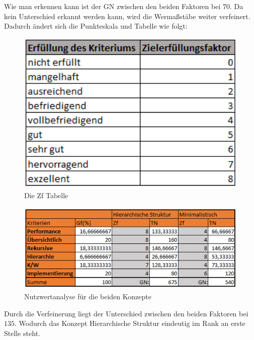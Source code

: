 Wie man erkennen kann ist der \ac{GN} zwischen den beiden Faktoren bei $70$.
Da kein Unterschied erkannt werden kann, wird die Wermaßstäbe weiter verfeinert.
Dadurch ändert sich die Punkteskala und Tabelle wie folgt:
\begin{figure}[h!]
 \centering
 \includegraphics[width=1\textwidth]{gfx/Picture/Ziel2.PNG}
 \caption{Die Zf Tabelle}
 \label{fig:Ziel}
\end{figure}
\newpage
\begin{figure}[h!]
 \centering
 \includegraphics[width=1\textwidth]{gfx/Picture/Nutzwert2.PNG}
 \caption{Nutzwertanalyse für die beiden Konzepte}
 \label{fig:Nutz}
\end{figure}
Durch die Verfeinerung liegt der Unterschied zwischen den beiden Faktoren bei $135$.
Wodurch das Konzept Hierarchische Struktur eindeutig im Rank an erste Stelle steht.

